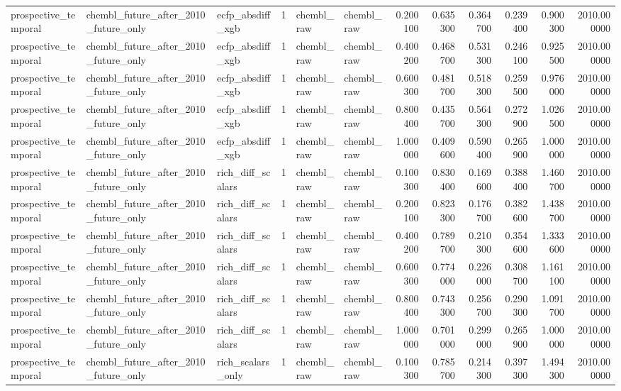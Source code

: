 \begin{longtable}{lllrllrrrrrr}
prospective\_temporal & chembl\_future\_after\_2010\_future\_only & ecfp\_absdiff\_xgb & 1 & chembl\_raw & chembl\_raw & 0.200100 & 0.635300 & 0.364700 & 0.239400 & 0.900300 & 2010.000000 \\
prospective\_temporal & chembl\_future\_after\_2010\_future\_only & ecfp\_absdiff\_xgb & 1 & chembl\_raw & chembl\_raw & 0.400200 & 0.468700 & 0.531300 & 0.246100 & 0.925500 & 2010.000000 \\
prospective\_temporal & chembl\_future\_after\_2010\_future\_only & ecfp\_absdiff\_xgb & 1 & chembl\_raw & chembl\_raw & 0.600300 & 0.481700 & 0.518300 & 0.259500 & 0.976000 & 2010.000000 \\
prospective\_temporal & chembl\_future\_after\_2010\_future\_only & ecfp\_absdiff\_xgb & 1 & chembl\_raw & chembl\_raw & 0.800400 & 0.435700 & 0.564300 & 0.272900 & 1.026500 & 2010.000000 \\
prospective\_temporal & chembl\_future\_after\_2010\_future\_only & ecfp\_absdiff\_xgb & 1 & chembl\_raw & chembl\_raw & 1.000000 & 0.409600 & 0.590400 & 0.265900 & 1.000000 & 2010.000000 \\
prospective\_temporal & chembl\_future\_after\_2010\_future\_only & rich\_diff\_scalars & 1 & chembl\_raw & chembl\_raw & 0.100300 & 0.830400 & 0.169600 & 0.388400 & 1.460700 & 2010.000000 \\
prospective\_temporal & chembl\_future\_after\_2010\_future\_only & rich\_diff\_scalars & 1 & chembl\_raw & chembl\_raw & 0.200100 & 0.823300 & 0.176700 & 0.382600 & 1.438700 & 2010.000000 \\
prospective\_temporal & chembl\_future\_after\_2010\_future\_only & rich\_diff\_scalars & 1 & chembl\_raw & chembl\_raw & 0.400200 & 0.789700 & 0.210300 & 0.354600 & 1.333600 & 2010.000000 \\
prospective\_temporal & chembl\_future\_after\_2010\_future\_only & rich\_diff\_scalars & 1 & chembl\_raw & chembl\_raw & 0.600300 & 0.774000 & 0.226000 & 0.308700 & 1.161100 & 2010.000000 \\
prospective\_temporal & chembl\_future\_after\_2010\_future\_only & rich\_diff\_scalars & 1 & chembl\_raw & chembl\_raw & 0.800400 & 0.743300 & 0.256700 & 0.290300 & 1.091700 & 2010.000000 \\
prospective\_temporal & chembl\_future\_after\_2010\_future\_only & rich\_diff\_scalars & 1 & chembl\_raw & chembl\_raw & 1.000000 & 0.701000 & 0.299000 & 0.265900 & 1.000000 & 2010.000000 \\
prospective\_temporal & chembl\_future\_after\_2010\_future\_only & rich\_scalars\_only & 1 & chembl\_raw & chembl\_raw & 0.100300 & 0.785700 & 0.214300 & 0.397300 & 1.494300 & 2010.000000 \\

\end{longtable}
